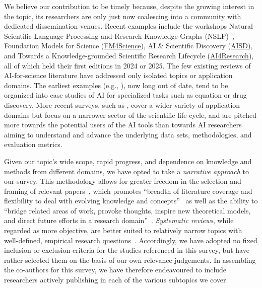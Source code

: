We believe our contribution to be timely because, despite the growing interest in the topic, its researchers are only just now coalescing into a community with dedicated dissemination venues.  Recent examples include the workshops Natural Scientific Language Processing and Research Knowledge Graphs (NSLP)~\cite{rehm2024natural}, Foundation Models for Science (\href{https://fm-science.github.io/}{FM4Science}), AI \& Scientific Discovery (\href{https://ai-and-scientific-discovery.github.io/}{AISD}), and Towards a Knowledge-grounded Scientific Research Lifecycle (\href{https://sites.google.com/view/ai4research2024}{AI4Research}), all of which held their first editions in 2024 or 2025.  The few existing reviews of AI-for-science literature have addressed only isolated topics or application domains.  The earliest examples (e.g., \cite{langley2000computational,dzeroski2007computational}), now long out of date, tend to be organized into case studies of AI for specialized tasks such as equation or drug discovery.  More recent surveys, such as \cite{hastings2023ai}, cover a wider variety of application domains but focus on a narrower sector of the scientific life cycle, and are pitched more towards the potential users of the AI tools than towards AI researchers aiming to understand and advance the underlying data sets, methodologies, and evaluation metrics.

Given our topic's wide scope, rapid progress, and dependence on knowledge and methods from different domains, we have opted to take a \emph{narrative approach} to our survey.  This methodology allows for greater freedom in the selection and framing of relevant papers~\cite{king2005understanding}, which promotes ``breadth of literature coverage and flexibility to deal with evolving knowledge and concepts''~\cite{byrne2016improving} as well as the ability to ``bridge related areas of work, provoke thoughts, inspire new theoretical models, and direct future efforts in a research domain''~\cite{pare2015synthesizing}. \emph{Systematic reviews}, while regarded as more objective, are better suited to relatively narrow topics with well-defined, empirical research questions~\cite{pare2015synthesizing}.  Accordingly, we have adopted no fixed inclusion or exclusion criteria for the studies referenced in this survey, but have rather selected them on the basis of our own relevance judgements.  In assembling the co-authors for this survey, we have therefore endeavoured to include researchers actively publishing in each of the various subtopics we cover.
